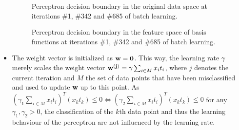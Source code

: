 \documentclass[a4]{article}
\begin{document}
\begin{itemize}
\begin{figure}[h!]
\caption{Perceptron decision boundary in the original data space at iterations \#1, \#342 and \#685 of batch learning.}
\label{fig:origBA}
\end{figure}
\begin{figure}[h!]
\centering
\caption{Perceptron decision boundary in the feature space of basis functions at iterations \#1, \#342 and \#685 of batch learning.}
\label{fig:transBA}
\end{figure}
\item The weight vector is initialized as ${\bf w} = {\bf 0}$. This way, the learning rate $\gamma$ merely scales the weight vector ${\bf w^{(j)}} = \gamma \sum_{i\in M}x_it_i$, where $j$ denotes the current iteration and $M$ the set of data points that have been misclassified and used to update {\bf w} up to this point. As $(\gamma_1 \sum_{i\in M}x_it_i)^T (x_kt_k) \leq 0 \Leftrightarrow  (\gamma_2 \sum_{i\in M}x_it_i)^T (x_kt_k) \leq 0$ for any $\gamma_1, \gamma_2 > 0$, the classification of the $k$th data point and thus the learning behaviour of the perceptron are not influenced by the learning rate.
\end{itemize}
\end{document}
